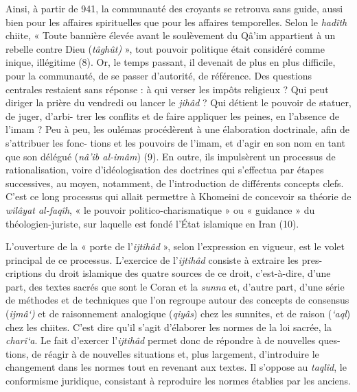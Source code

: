 Ainsi, à partir de 941, la communauté des croyants se retrouva sans
guide, aussi bien pour les affaires spirituelles que pour les affaires
temporelles. Selon le \emph{hadîth} chiite, « Toute bannière élevée
avant le soulèvement du Qâ'im appartient à un rebelle contre Dieu
(\emph{tâghût)} », tout pouvoir politique était considéré comme inique,
illégitime (8). Or, le temps passant, il devenait de plus en plus
difficile, pour la communauté, de se passer d'autorité, de référence.
Des questions centrales restaient sans réponse : à qui verser les impôts
religieux ? Qui peut diriger la prière du vendredi ou lancer le
\emph{jihâd} ? Qui détient le pouvoir de statuer, de juger, d'arbi- trer
les conflits et de faire appliquer les peines, en l'absence de l'imam ?
Peu à peu, les oulémas procédèrent à une élaboration doctrinale, afin de
s'attribuer les fonc- tions et les pouvoirs de l'imam, et d'agir en son
nom en tant que son délégué (\emph{nâ'ib al-imâm}) (9). En outre, ils
impulsèrent un processus de rationalisation, voire d'idéologisation des
doctrines qui s'effectua par étapes successives, au moyen, notamment, de
l'introduction de différents concepts clefs. C'est ce long processus qui
allait permettre à Khomeini de concevoir sa théorie de \emph{wilâyat
al-faqîh}, « le pouvoir politico-charismatique » ou « guidance » du
théologien-juriste, sur laquelle est fondé l'État islamique en Iran
(10).

L'ouverture de la « porte de l'\emph{ijtihâd} », selon l'expression en
vigueur, est le volet principal de ce processus. L'exercice de
l'\emph{ijtihâd} consiste à extraire les pres- criptions du droit
islamique des quatre sources de ce droit, c'est-à-dire, d'une part, des
textes sacrés que sont le Coran et la \emph{sunna} et, d'autre part,
d'une série de méthodes et de techniques que l'on regroupe autour des
concepts de consensus (\emph{ijmâ`)} et de raisonnement analogique
(\emph{qiyâs}) chez les sunnites, et de raison (\emph{`aql}) chez les
chiites. C'est dire qu'il s'agit d'élaborer les normes de la loi sacrée,
la \emph{charî`a}. Le fait d'exercer l'\emph{ijtihâd} permet donc de
répondre à de nouvelles ques- tions, de réagir à de nouvelles situations
et, plus largement, d'introduire le changement dans les normes tout en
revenant aux textes. Il s'oppose au \emph{taqlîd}, le conformisme
juridique, consistant à reproduire les normes établies par les anciens.

